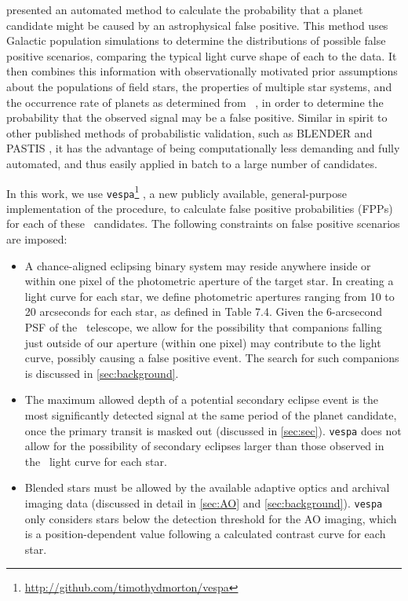 \citet{Morton12} presented an automated method to calculate the
probability that a planet candidate might be caused by an
astrophysical false positive.
This method uses Galactic population simulations to determine the
distributions of possible false positive scenarios, comparing the
typical light curve shape of each to the data.
It then combines this information with observationally motivated prior
assumptions about the populations of field stars, the properties of
multiple star systems, and the occurrence rate of planets as determined
from \kep\ \citep{Fressin13}, in order to determine the probability that
the observed signal may be a false positive.
Similar in spirit to other published methods of
probabilistic validation, such as BLENDER \citep{Torres11a} and PASTIS
\citep{Diaz14a}, it has the advantage of being computationally less demanding
and fully automated, and thus easily applied in batch to a large
number of candidates.

In this work, we use
\texttt{vespa}\footnote{\url{http://github.com/timothydmorton/vespa}} \citep{Morton15b},
a new publicly available, general-purpose implementation
of the \citet{Morton12} procedure,
to calculate false positive probabilities (FPPs) for each of these
\KT\ candidates.
The following constraints on false positive
scenarios are imposed:
\begin{itemize}
\item A chance-aligned eclipsing binary system may reside anywhere inside
or within one pixel of the photometric aperture of the target star.
In creating a light curve for each star, we define photometric apertures ranging
from 10 to 20 arcseconds for each star, as defined in Table 7.4.
Given the 6-arcsecond PSF of the \kep\ telescope, we allow for the possibility
that companions falling just outside of our aperture (within one pixel) may
contribute to the light curve, possibly causing a false positive event.
The search for such companions is discussed in
\textsection \ref{sec:background}.
\item The maximum allowed depth of a potential secondary eclipse event
is the most significantly detected signal at the same
period of the planet candidate, once the primary transit is masked out
(discussed in \textsection\ref{sec:sec}).
\texttt{vespa} does not allow for the possibility of secondary eclipses
larger than those observed in the \KT\ light curve for each star.
\item Blended stars must be allowed by the available adaptive optics
and archival imaging data (discussed in detail in \textsection
\ref{sec:AO} and \ref{sec:background}).
\texttt{vespa} only considers stars below the detection threshold for
the AO imaging, which is a position-dependent value following a calculated
contrast curve for each star.
\end{itemize}

